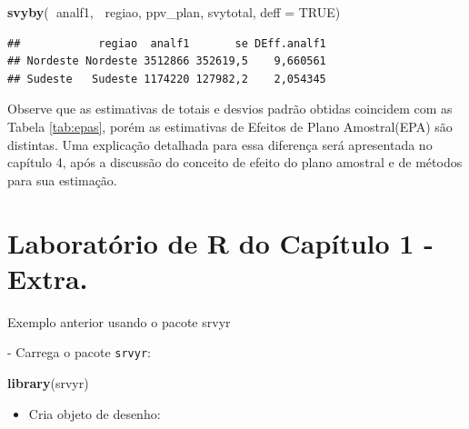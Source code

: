 \documentclass[]{book}
\newenvironment{Shaded}{\begin{snugshade}}{\end{snugshade}}
\newcommand{\KeywordTok}[1]{\textcolor[rgb]{0.13,0.29,0.53}{\textbf{#1}}}
\newcommand{\DataTypeTok}[1]{\textcolor[rgb]{0.13,0.29,0.53}{#1}}
\newcommand{\StringTok}[1]{\textcolor[rgb]{0.31,0.60,0.02}{#1}}
\newcommand{\OtherTok}[1]{\textcolor[rgb]{0.56,0.35,0.01}{#1}}
\newcommand{\OperatorTok}[1]{\textcolor[rgb]{0.81,0.36,0.00}{\textbf{#1}}}
\newcommand{\NormalTok}[1]{#1}
\providecommand{\tightlist}{%
  \setlength{\itemsep}{0pt}\setlength{\parskip}{0pt}}
\theoremstyle{definition}
\theoremstyle{definition}
\theoremstyle{definition}
\theoremstyle{remark}
\let\BeginKnitrBlock\begin \let\EndKnitrBlock\end
\begin{document}
\begin{Shaded}
\begin{Highlighting}[]
\KeywordTok{svyby}\NormalTok{(}\OperatorTok{~}\NormalTok{analf1, }\OperatorTok{~}\NormalTok{regiao, ppv_plan, svytotal, }\DataTypeTok{deff =} \OtherTok{TRUE}\NormalTok{)}
\end{Highlighting}
\end{Shaded}

\begin{verbatim}
##            regiao  analf1       se DEff.analf1
## Nordeste Nordeste 3512866 352619,5    9,660561
## Sudeste   Sudeste 1174220 127982,2    2,054345
\end{verbatim}

Observe que as estimativas de totais e desvios padrão obtidas coincidem
com as Tabela \ref{tab:epas}, porém as estimativas de Efeitos de Plano
Amostral(EPA) são distintas. Uma explicação detalhada para essa
diferença será apresentada no capítulo 4, após a discussão do conceito
de efeito do plano amostral e de métodos para sua estimação.

\section{Laboratório de R do Capítulo 1 -
Extra.}\label{laboratorio-de-r-do-capitulo-1---extra.}

\BeginKnitrBlock{example}
\protect\hypertarget{exm:exe13}{}{\label{exm:exe13} }Exemplo anterior usando
o pacote srvyr
\EndKnitrBlock{example} - Carrega o pacote \texttt{srvyr}:

\begin{Shaded}
\begin{Highlighting}[]
\KeywordTok{library}\NormalTok{(srvyr)}
\end{Highlighting}
\end{Shaded}

\begin{itemize}
\tightlist
\item
  Cria objeto de desenho:
\end{itemize}

\begin{Shaded}
\end{Shaded}
\end{document}
